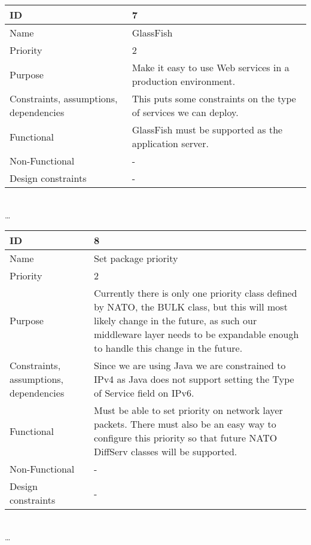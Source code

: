 \begin{center}
	\begin{tabular}{| p{4cm} | p{8cm} |}
		\hline
		ID & 7 \\
		\hline
		Name & GlassFish \\
		\hline
		Priority & 2 \\
		\hline
		Purpose & Make it easy to use Web services in a production environment. \\
		\hline 
		Constraints, assumptions, dependencies & This puts some constraints on the type of services we can deploy. \\
		\hline  
		Functional & GlassFish must be supported as the application server.  \\
		\hline
		Non-Functional & - \\ 
		\hline
		Design constraints & - \\
		\hline
	\end{tabular}
	\\  \ldots  \\

	\begin{tabular}{| p{4cm} | p{8cm} |}
		\hline
		ID & 8 \\
		\hline
		Name & Set package priority \\
		\hline
		Priority & 2 \\
		\hline
		Purpose & Currently there is only one priority class defined by NATO, the BULK class, but this will most likely change in the future, as such our middleware layer needs to be expandable enough to handle this change in the future. \\
		\hline 
		Constraints, assumptions, dependencies & Since we are using Java we are constrained to IPv4 as Java does not support setting the Type of Service field on IPv6.\\
		\hline  
		Functional & Must be able to set priority on network layer packets. There must also be an easy way to configure this priority so that future NATO DiffServ classes will be supported. \\
		\hline
		Non-Functional & -\\ 
		\hline
		Design constraints & - \\
		\hline
	\end{tabular}
	\\  \ldots  \\


\end{center}
